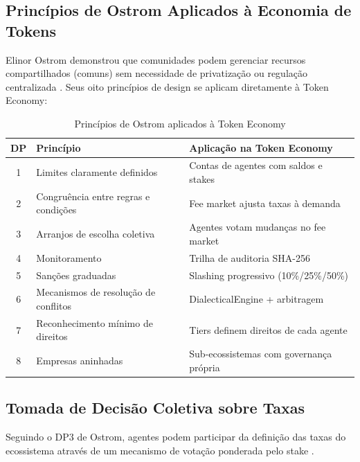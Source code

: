 \subsection{Princípios de Ostrom Aplicados à Economia de Tokens}

Elinor Ostrom demonstrou que comunidades podem gerenciar recursos
compartilhados (comuns) sem necessidade de privatização ou
regulação centralizada \cite{ostrom1990governing}. Seus oito
princípios de design se aplicam diretamente à Token Economy:

\begin{table}[htb]
\centering
\caption{Princípios de Ostrom aplicados à Token Economy}
\label{tab:ostrom-token}
\begin{tabular}{cp{5cm}p{6cm}}
\toprule
\textbf{DP} & \textbf{Princípio} & \textbf{Aplicação na Token Economy} \\
\midrule
1 & Limites claramente definidos & Contas de agentes com saldos e stakes \\
2 & Congruência entre regras e condições & Fee market ajusta taxas à demanda \\
3 & Arranjos de escolha coletiva & Agentes votam mudanças no fee market \\
4 & Monitoramento & Trilha de auditoria SHA-256 \\
5 & Sanções graduadas & Slashing progressivo (10\%/25\%/50\%) \\
6 & Mecanismos de resolução de conflitos & DialecticalEngine + arbitragem \\
7 & Reconhecimento mínimo de direitos & Tiers definem direitos de cada agente \\
8 & Empresas aninhadas & Sub-ecossistemas com governança própria \\
\bottomrule
\end{tabular}
\end{table}

\subsection{Tomada de Decisão Coletiva sobre Taxas}

Seguindo o DP3 de Ostrom, agentes podem participar da definição
das taxas do ecossistema através de um mecanismo de votação
ponderada pelo stake \cite{opencode2026token,
ostrom1990governing}.

